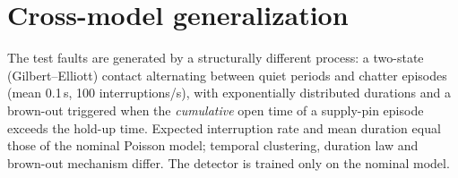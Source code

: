 \documentclass[10pt]{article}
\begin{document}
\begin{table}[!htbp]
\centering
\caption{Prognosis, failure at 20\,$\Omega$ (100 of 166 vehicles fail; health-index $R^2$ = 0.86).}\label{tab:s_prog20}
\footnotesize
{}
\end{table}
\section{Cross-model generalization}
The test faults are generated by a structurally different process: a two-state (Gilbert--Elliott)
contact alternating between quiet periods and chatter episodes (mean 0.1\,s, 100 interruptions/s),
with exponentially distributed durations and a brown-out triggered when the \emph{cumulative} open
time of a supply-pin episode exceeds the hold-up time. Expected interruption rate and mean duration
equal those of the nominal Poisson model; temporal clustering, duration law and brown-out mechanism
differ. The detector is trained only on the nominal model.
\begin{table}[!htbp]
\centering
\caption{Train on the nominal model, test on the nominal or the Markov model (vehicle-disjoint).}\label{tab:s_cm}
\footnotesize
{}
\end{table}
\end{document}
